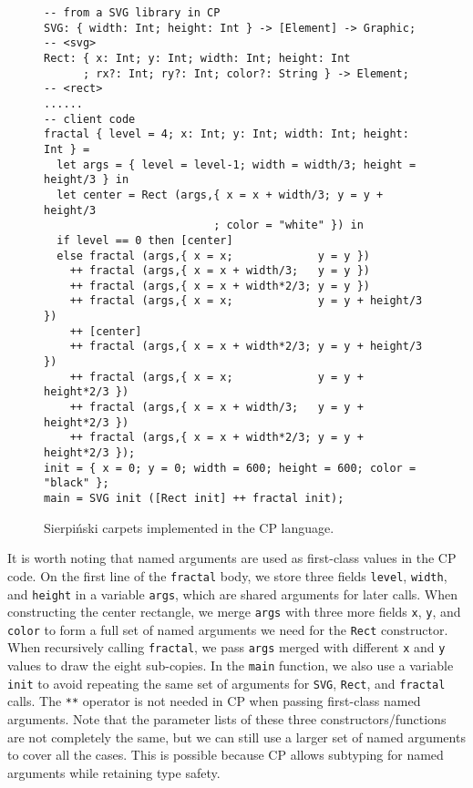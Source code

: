 \begin{figure}[t]
\begin{lstlisting}[language=CP,xleftmargin=.05\textwidth]
-- from a SVG library in CP
SVG: { width: Int; height: Int } -> [Element] -> Graphic;    -- <svg>
Rect: { x: Int; y: Int; width: Int; height: Int
      ; rx?: Int; ry?: Int; color?: String } -> Element;     -- <rect>
......
-- client code
fractal { level = 4; x: Int; y: Int; width: Int; height: Int } =
  let args = { level = level-1; width = width/3; height = height/3 } in
  let center = Rect (args,{ x = x + width/3; y = y + height/3
                          ; color = "white" }) in
  if level == 0 then [center]
  else fractal (args,{ x = x;             y = y })
    ++ fractal (args,{ x = x + width/3;   y = y })
    ++ fractal (args,{ x = x + width*2/3; y = y })
    ++ fractal (args,{ x = x;             y = y + height/3 })
    ++ [center]
    ++ fractal (args,{ x = x + width*2/3; y = y + height/3 })
    ++ fractal (args,{ x = x;             y = y + height*2/3 })
    ++ fractal (args,{ x = x + width/3;   y = y + height*2/3 })
    ++ fractal (args,{ x = x + width*2/3; y = y + height*2/3 });
init = { x = 0; y = 0; width = 600; height = 600; color = "black" };
main = SVG init ([Rect init] ++ fractal init);
\end{lstlisting}
\caption{Sierpiński carpets implemented in the CP language.} \label{fig:fractal}
\end{figure}

It is worth noting that named arguments are used as first-class values in the CP
code. On the first line of the \lstinline{fractal} body, we store three fields
\lstinline{level}, \lstinline{width}, and \lstinline{height} in a variable
\lstinline{args}, which are shared arguments for later calls. When constructing
the center rectangle, we merge \lstinline{args} with three more fields
\lstinline{x}, \lstinline{y}, and \lstinline{color} to form a full set of named
arguments we need for the \lstinline{Rect} constructor. When recursively calling
\lstinline{fractal}, we pass \lstinline{args} merged with different
\lstinline{x} and \lstinline{y} values to draw the eight sub-copies. In the
\lstinline{main} function, we also use a variable \lstinline{init} to avoid
repeating the same set of arguments for \lstinline{SVG}, \lstinline{Rect}, and
\lstinline{fractal} calls. The \lstinline{**} operator is not needed in CP when
passing first-class named arguments. Note that the parameter lists of these
three constructors/functions are not completely the same, but we can still use a
larger set of named arguments to cover all the cases. This is possible because
CP allows subtyping for named arguments while retaining type safety.

